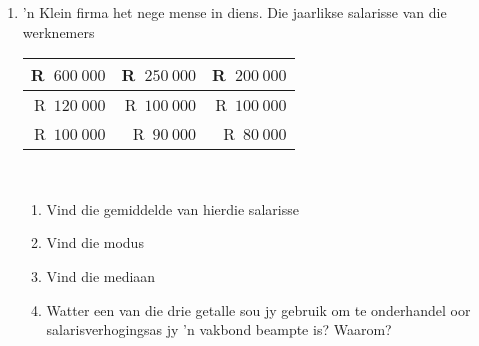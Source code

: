 \begin{eocexercises}{}
\begin{enumerate}[itemsep=6pt, label=\textbf{\arabic*}.]
  \item ’n Klein firma het nege mense in diens. Die jaarlikse salarisse van die werknemers
\\
    \begin{center}
      \begin{tabular}{|r|r|r|} \hline
        R~$600~000$ & R~$250~000$ & R~$200~000$ \\\hline
        R~$120~000$ & R~$100~000$ & R~$100~000$ \\\hline
        R~$100~000$ &  R~$90~000$ &  R~$80~000$ \\\hline
      \end{tabular}
    \end{center}
\vspace {8pt}\\
    \begin{enumerate}[noitemsep, label=\textbf{(\alph*)} ]
    \item Vind die gemiddelde van hierdie salarisse
    \item Vind die modus
    \item Vind die mediaan
    \item Watter een van die drie getalle sou jy gebruik om te onderhandel oor salarisverhogingsas jy ’n vakbond beampte is? Waarom?
    \end{enumerate}

  \end{enumerate}

\end{eocexercises}


